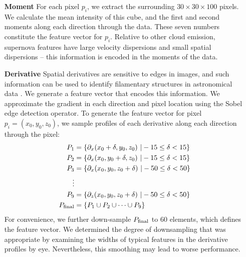 \begin{enumerate}
\item[\textbf{Moment}] For each pixel $p_i$, we extract the surrounding $30\times30\times100$ pixels. We calculate the mean intensity of this cube, and the first and second moments along each direction through the data. These seven numbers constitute the feature vector for $p_i$.  Relative to other cloud emission, supernova features have large velocity dispersions and small spatial dispersions -- this information is encoded in the moments of the data.

\item[\textbf{Derivative}] Spatial derivatives are sensitive to edges in images, and such information can be used to identify filamentary structures in astronomical data \citep{Molinari10}. We generate a feature vector that encodes this information. We approximate the gradient in each direction and pixel location using the Sobel edge detection operator. To generate the feature vector for pixel $p_i = (x_0, y_0, z_0)$, we sample profiles of each derivative along each direction through the pixel:
\begin{align}
\nonumber P_1 &= \left \{ \partial_x(x_0 + \delta, y_0, z_0) ~|  -15 \leq \delta < 15 \right \} \\
\nonumber P_2 &= \left \{ \partial_x(x_0, y_0 + \delta, z_0) ~|  -15 \leq \delta < 15 \right \} \\
\nonumber P_3 &= \left \{ \partial_x(x_0, y_0, z_0 + \delta) ~|  -50 \leq \delta < 50 \right \} \\
\nonumber \vdots \\
\nonumber P_9 &= \left \{ \partial_z(x_0, y_0, z_0 + \delta) ~| -50 \leq \delta < 50 \right \} \\
\nonumber P_{\rm final} &= \left\{ P_1 \cup P_2 \cup \cdots \cup P_9 \right\}
\end{align}
For convenience, we further down-sample $P_{\rm final}$ to 60 elements, which defines the feature vector. We determined the degree of downsampling that was appropriate by examining the widths of typical features in the derivative profiles by eye. Nevertheless, this smoothing may lead to worse performance.


\end{enumerate}
